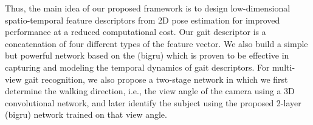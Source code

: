 Thus, the main idea of our proposed framework is to design low-dimensional spatio-temporal feature descriptors from 2D pose estimation for improved performance at a reduced computational cost. Our gait descriptor is a concatenation of four different types of the feature vector. We also build a simple but powerful network based on the (\gls{bigru}) which is proven to be effective in capturing and modeling the temporal dynamics of gait descriptors. For multi-view gait recognition, we also propose a two-stage network in which we first determine the walking direction, i.e., the view angle of the camera using a 3D convolutional network, and later identify the subject using the proposed 2-layer (\gls{bigru}) network trained on that view angle. 



